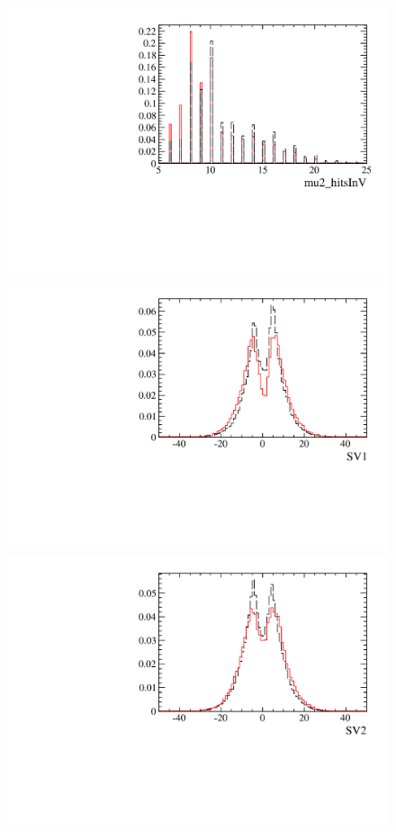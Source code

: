 \begin{figure} [htb!]
\begin{center}
\includegraphics[scale=0.20]{figs/mu2_hitsInVPARTIAL.pdf}
\includegraphics[scale=0.20]{figs/SV1PARTIAL.pdf}
\includegraphics[scale=0.20]{figs/SV2PARTIAL.pdf}

\end{center}
\end{figure}
